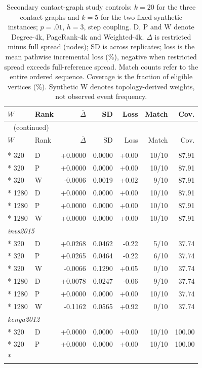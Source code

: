 \begin{longtable}{llrrrrr}
\caption{Secondary contact-graph study controls: $k=20$ for the three contact graphs and $k=5$ for the two fixed synthetic instances; $p=.01$, $h=3$, step coupling. D, P and W denote Degree-4k, PageRank-4k and Weighted-4k. $\Delta$ is restricted minus full spread (nodes); SD is across replicates; loss is the mean pathwise incremental loss (\%), negative when restricted spread exceeds full-reference spread. Match counts refer to the entire ordered sequence. Coverage is the fraction of eligible vertices (\%). Synthetic W denotes topology-derived weights, not observed event frequency.}\label{tab:hist-secondary}\\
\toprule
$W$ & Rank & $\overline\Delta$ & SD & Loss & Match & Cov. \\
\midrule
\endfirsthead
\multicolumn{7}{l}{\tablename~\thetable{} (continued)}\\
\toprule
$W$ & Rank & $\overline\Delta$ & SD & Loss & Match & Cov. \\
\midrule
\endhead
\bottomrule
\endfoot
\multicolumn{7}{l}{\textit{invs2013}}\\*
320 & D & +0.0000 & 0.0000 & +0.00 & 10/10 & 87.91\\*
320 & P & +0.0000 & 0.0000 & +0.00 & 10/10 & 87.91\\*
320 & W & -0.0006 & 0.0019 & +0.02 & 9/10 & 87.91\\*
1280 & D & +0.0000 & 0.0000 & +0.00 & 10/10 & 87.91\\*
1280 & P & +0.0000 & 0.0000 & +0.00 & 10/10 & 87.91\\*
1280 & W & +0.0000 & 0.0000 & +0.00 & 10/10 & 87.91\\
\multicolumn{7}{l}{\textit{invs2015}}\\*
320 & D & +0.0268 & 0.0462 & -0.22 & 5/10 & 37.74\\*
320 & P & +0.0265 & 0.0464 & -0.22 & 6/10 & 37.74\\*
320 & W & -0.0066 & 0.1290 & +0.05 & 0/10 & 37.74\\*
1280 & D & +0.0078 & 0.0247 & -0.06 & 9/10 & 37.74\\*
1280 & P & +0.0000 & 0.0000 & +0.00 & 10/10 & 37.74\\*
1280 & W & -0.1162 & 0.0565 & +0.92 & 0/10 & 37.74\\
\multicolumn{7}{l}{\textit{kenya2012}}\\*
320 & D & +0.0000 & 0.0000 & +0.00 & 10/10 & 100.00\\*
320 & P & +0.0000 & 0.0000 & +0.00 & 10/10 & 100.00\\*

\end{longtable}

